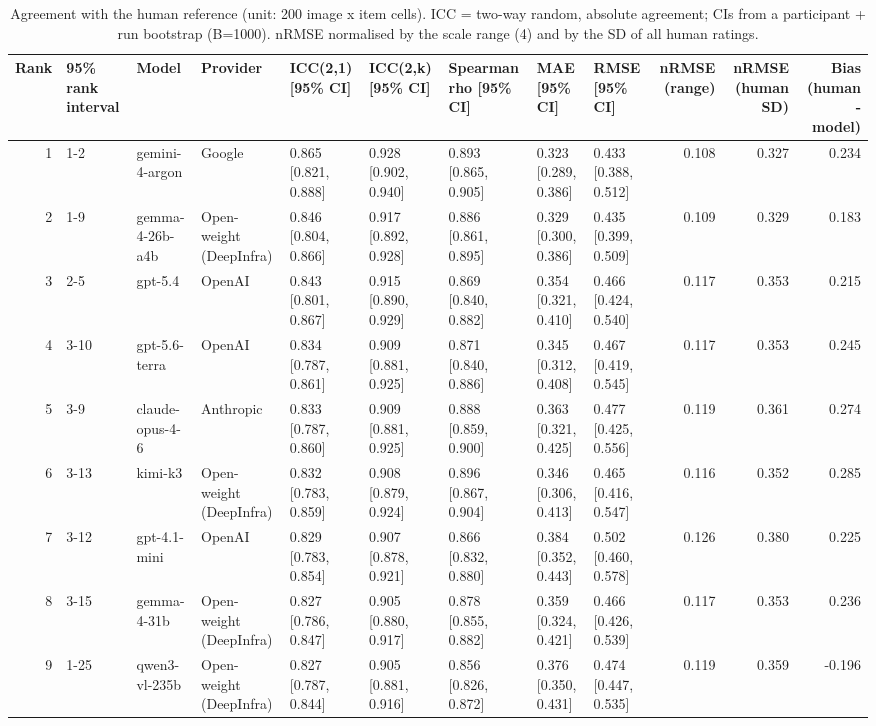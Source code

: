 \begin{table}
\caption{Agreement with the human reference (unit: 200 image x item cells). ICC = two-way random, absolute agreement; CIs from a participant + run bootstrap (B=1000). nRMSE normalised by the scale range (4) and by the SD of all human ratings.}
\begin{tabular}{rllllllllrrr}
\toprule
Rank & 95\% rank interval & Model & Provider & ICC(2,1) [95\% CI] & ICC(2,k) [95\% CI] & Spearman rho [95\% CI] & MAE [95\% CI] & RMSE [95\% CI] & nRMSE (range) & nRMSE (human SD) & Bias (human - model) \\
\midrule
1 & 1-2 & gemini-4-argon & Google & 0.865 [0.821, 0.888] & 0.928 [0.902, 0.940] & 0.893 [0.865, 0.905] & 0.323 [0.289, 0.386] & 0.433 [0.388, 0.512] & 0.108 & 0.327 & 0.234 \\
2 & 1-9 & gemma-4-26b-a4b & Open-weight (DeepInfra) & 0.846 [0.804, 0.866] & 0.917 [0.892, 0.928] & 0.886 [0.861, 0.895] & 0.329 [0.300, 0.386] & 0.435 [0.399, 0.509] & 0.109 & 0.329 & 0.183 \\
3 & 2-5 & gpt-5.4 & OpenAI & 0.843 [0.801, 0.867] & 0.915 [0.890, 0.929] & 0.869 [0.840, 0.882] & 0.354 [0.321, 0.410] & 0.466 [0.424, 0.540] & 0.117 & 0.353 & 0.215 \\
4 & 3-10 & gpt-5.6-terra & OpenAI & 0.834 [0.787, 0.861] & 0.909 [0.881, 0.925] & 0.871 [0.840, 0.886] & 0.345 [0.312, 0.408] & 0.467 [0.419, 0.545] & 0.117 & 0.353 & 0.245 \\
5 & 3-9 & claude-opus-4-6 & Anthropic & 0.833 [0.787, 0.860] & 0.909 [0.881, 0.925] & 0.888 [0.859, 0.900] & 0.363 [0.321, 0.425] & 0.477 [0.425, 0.556] & 0.119 & 0.361 & 0.274 \\
6 & 3-13 & kimi-k3 & Open-weight (DeepInfra) & 0.832 [0.783, 0.859] & 0.908 [0.879, 0.924] & 0.896 [0.867, 0.904] & 0.346 [0.306, 0.413] & 0.465 [0.416, 0.547] & 0.116 & 0.352 & 0.285 \\
7 & 3-12 & gpt-4.1-mini & OpenAI & 0.829 [0.783, 0.854] & 0.907 [0.878, 0.921] & 0.866 [0.832, 0.880] & 0.384 [0.352, 0.443] & 0.502 [0.460, 0.578] & 0.126 & 0.380 & 0.225 \\
8 & 3-15 & gemma-4-31b & Open-weight (DeepInfra) & 0.827 [0.786, 0.847] & 0.905 [0.880, 0.917] & 0.878 [0.855, 0.882] & 0.359 [0.324, 0.421] & 0.466 [0.426, 0.539] & 0.117 & 0.353 & 0.236 \\
9 & 1-25 & qwen3-vl-235b & Open-weight (DeepInfra) & 0.827 [0.787, 0.844] & 0.905 [0.881, 0.916] & 0.856 [0.826, 0.872] & 0.376 [0.350, 0.431] & 0.474 [0.447, 0.535] & 0.119 & 0.359 & -0.196 \\

\end{tabular}
\end{table}
